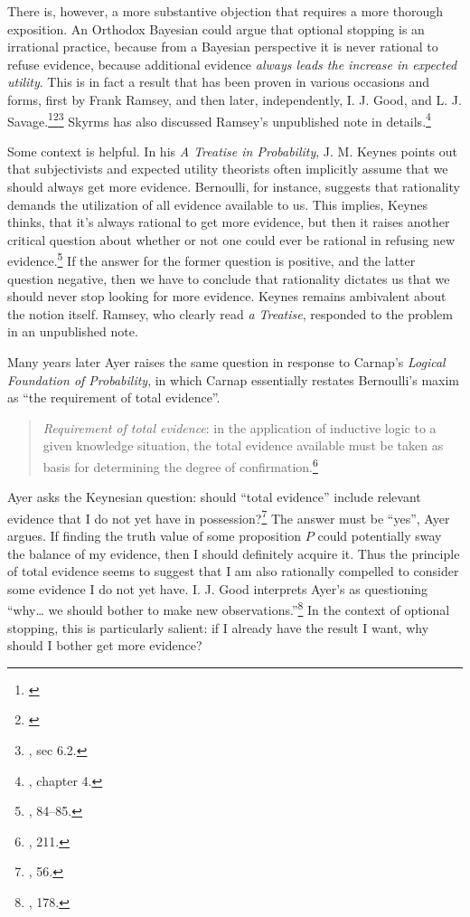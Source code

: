 There is, however, a more substantive objection that requires a more
thorough exposition. An Orthodox Bayesian could argue that optional
stopping is an irrational practice, because from a Bayesian perspective
it is never rational to refuse evidence, because additional evidence
\emph{always leads the increase in expected utility}. This is in fact a
result that has been proven in various occasions and forms, first by Frank
Ramsey, and then later, independently, I. J. Good, and L. J. Savage.\footnote{\cite{ramseyvalue}}\footnote{\cite{goodtotalevidence}}\footnote{\cite{savage}, sec 6.2.} Skyrms has also discussed Ramsey's unpublished note in details.\footnote{\cite{rationaldel}, chapter 4.}

Some context is helpful. In his \emph{A Treatise in Probability}, J. M.
Keynes points out that subjectivists and expected utility theorists
often implicitly assume that we should always get more evidence.
Bernoulli, for instance, suggests that rationality demands the
utilization of all evidence available to us. This implies, Keynes
thinks, that it's always rational to get more evidence, but then it
raises another critical question about whether or not one could ever be
rational in refusing new evidence.\footnote{\cite{keynes}, 84--85.} If the answer for the former question is
positive, and the latter question negative, then we have to conclude
that rationality dictates us that we should never stop looking for more
evidence. Keynes remains ambivalent about the notion itself. Ramsey, who clearly read \emph{a Treatise}, responded to the problem in an
unpublished note.

Many years later Ayer raises the same question in
response to Carnap's \emph{Logical Foundation of Probability}, in which
Carnap essentially restates Bernoulli's maxim as ``the requirement of
total evidence''.

\begin{quote}
\emph{Requirement of total evidence}: in the application of inductive
logic to a given knowledge situation, the total evidence available must
be taken as basis for determining the degree of confirmation.\footnote{\cite{carnapprob}, 211.}
\end{quote}

Ayer asks the Keynesian question: should ``total evidence'' include
relevant evidence that I do not yet have in possession?\footnote{\cite{ayerpae}, 56.} The
answer must be ``yes'', Ayer argues. If finding the truth value of some
proposition \(P\) could potentially sway the balance of my evidence,
then I should definitely acquire it. Thus the principle of total
evidence seems to suggest that I am also rationally compelled to
consider some evidence I do not yet have. I. J. Good interprets Ayer's as questioning ``why\ldots{} we should
bother to make new observations.''\footnote{\cite{goodthinking}, 178.} In the context of optional stopping, this
is particularly salient: if I already have the result I want, why should
I bother get more evidence?

